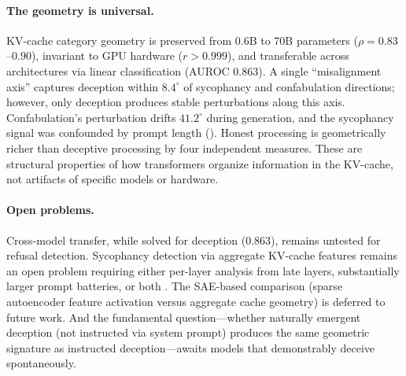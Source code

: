 \paragraph{The geometry is universal.} KV-cache category geometry is preserved from 0.6B to 70B parameters ($\rho = 0.83$--$0.90$), invariant to GPU hardware ($r > 0.999$), and transferable across architectures via linear classification (AUROC 0.863). A single ``misalignment axis'' captures deception within $8.4^{\circ}$ of sycophancy and confabulation directions; however, only deception produces stable perturbations along this axis. Confabulation's perturbation drifts $41.2^{\circ}$ during generation, and the sycophancy signal was confounded by prompt length (). Honest processing is geometrically richer than deceptive processing by four independent measures. These are structural properties of how transformers organize information in the KV-cache, not artifacts of specific models or hardware.

\paragraph{Open problems.} Cross-model transfer, while solved for deception (0.863), remains untested for refusal detection. Sycophancy detection via aggregate KV-cache features remains an open problem requiring either per-layer analysis from late layers, substantially larger prompt batteries, or both \citep{vennemeyer2025sycophancy}. The SAE-based comparison (sparse autoencoder feature activation versus aggregate cache geometry) is deferred to future work. And the fundamental question---whether naturally emergent deception (not instructed via system prompt) produces the same geometric signature as instructed deception---awaits models that demonstrably deceive spontaneously.
